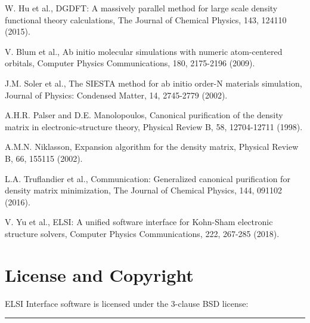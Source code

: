 \documentclass{report}
\begin{document}
\begin{thebibliography}{9}
W. Hu et al., DGDFT: A massively parallel method for large scale density functional theory calculations, The Journal of Chemical Physics, 143, 124110 (2015).

V. Blum et al., Ab initio molecular simulations with numeric atom-centered orbitals, Computer Physics Communications, 180, 2175-2196 (2009).


J.M. Soler et al., The SIESTA method for ab initio order-N materials simulation, Journal of Physics: Condensed Matter, 14, 2745-2779 (2002).


A.H.R. Palser and D.E. Manolopoulos, Canonical purification of the density matrix in electronic-structure theory, Physical Review B, 58, 12704-12711 (1998).

A.M.N. Niklasson, Expansion algorithm for the density matrix, Physical Review B, 66, 155115 (2002).

L.A. Truflandier et al., Communication: Generalized canonical purification for density matrix minimization, The Journal of Chemical Physics, 144, 091102 (2016).

V. Yu et al., ELSI: A unified software interface for Kohn-Sham electronic structure solvers, Computer Physics Communications, 222, 267-285 (2018).

\end{thebibliography}

\chapter*{License and Copyright}
ELSI Interface software is licensed under the 3-clause BSD license:\\
\bigskip

\noindent\rule{18cm}{0.4pt}
\bigskip
\end{document}
